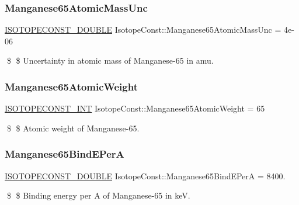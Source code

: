 \subsubsection{\texorpdfstring{Manganese65\+Atomic\+Mass\+Unc}{Manganese65AtomicMassUnc}}
{\footnotesize\ttfamily \mbox{\hyperlink{group___isotope_const-_macros_ga8f45a7272ce02c0b4c65c44636ed719a}{I\+S\+O\+T\+O\+P\+E\+C\+O\+N\+S\+T\+\_\+\+D\+O\+U\+B\+LE}} Isotope\+Const\+::\+Manganese65\+Atomic\+Mass\+Unc = 4e-\/06}

\$ \$ Uncertainty in atomic mass of Manganese-\/65 in amu. \mbox{\label{group___isotope_const-_manganese-_mn65_gad7095c0ec45ada90cb219eed190231ba}} 
\subsubsection{\texorpdfstring{Manganese65\+Atomic\+Weight}{Manganese65AtomicWeight}}
{\footnotesize\ttfamily \mbox{\hyperlink{group___isotope_const-_macros_ga5f18360b3e99483a35c32d789e62621c}{I\+S\+O\+T\+O\+P\+E\+C\+O\+N\+S\+T\+\_\+\+I\+NT}} Isotope\+Const\+::\+Manganese65\+Atomic\+Weight = 65}

\$ \$ Atomic weight of Manganese-\/65. \mbox{\label{group___isotope_const-_manganese-_mn65_gaaf7269dd7782c4f23d0b38ec8964f6c5}} 
\subsubsection{\texorpdfstring{Manganese65\+Bind\+E\+PerA}{Manganese65BindEPerA}}
{\footnotesize\ttfamily \mbox{\hyperlink{group___isotope_const-_macros_ga8f45a7272ce02c0b4c65c44636ed719a}{I\+S\+O\+T\+O\+P\+E\+C\+O\+N\+S\+T\+\_\+\+D\+O\+U\+B\+LE}} Isotope\+Const\+::\+Manganese65\+Bind\+E\+PerA = 8400.}

\$ \$ Binding energy per A of Manganese-\/65 in keV. \mbox{\label{group___isotope_const-_manganese-_mn65_ga6efdc527dcd643382ad3d1446385fd06}} 
